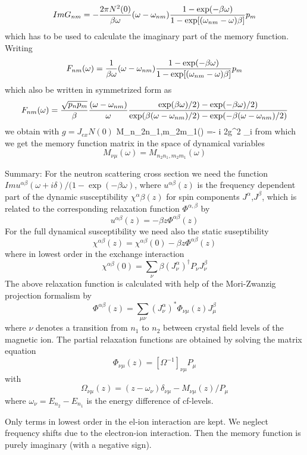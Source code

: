 $$
Im G_{nm}=-{2\pi N^2(0)\over \beta \omega}(\omega -\omega_{nm}) {1-\exp(-\beta
\omega)\over
1-\exp[(\omega_{nm}-\omega)\beta]}p_m
$$
which has to be used to calculate the imaginary part of the memory function.
Writing 
$$
F_{nm}(\omega )= {1\over \beta \omega}(\omega -\omega_{nm}) {1-\exp(-\beta
\omega)\over
1-\exp[(\omega_{nm}-\omega)\beta]}p_m
$$
which also be written in symmetrized form as
$$
F_{nm}(\omega )= {\sqrt{p_np_m}\over \beta}{(\omega -\omega_{nm})\over
\omega} {\exp(\beta \omega)/2) - \exp(-\beta \omega)/2)\over
\exp(\beta (\omega-\omega_{nm})/2) - \exp(-\beta (\omega -\omega_{nm})/2)}
$$
we obtain with $g=J_{ex}N(0)$
\eqnarray
M_{n_2n_1,m_2m_1}(\omega) =- i 2\pi g^2
\sum_i
\nonumber
\endeqnarray
from which we get the memory function matrix in the space of dynamical variables
$$
M_{\nu \mu}(\omega)= M_{n_2n_1,m_2m_1}(\omega)
$$

\bigskip
\noindent


Summary:
For the neutron scattering cross section we need the function 
$Im u^{\alpha\beta}(\omega+i\delta)/(1-\exp(-\beta\omega)$, where
$u^{\alpha\beta}(z)$ is the frequency dependent part of the dynamic
susceptibility $\chi^\alpha\beta(z)$ for spin components  $J^\alpha$,$J^\beta$, which is
related to the corresponding relaxation function $\Phi^{\alpha,\beta}$ by
$$
u^{\alpha\beta}(z)= -\beta z \Phi^{\alpha\beta}(z)
$$
For the full dynamical susceptibility we need also the static suseptibility
$$
\chi^{\alpha\beta}(z) = \chi^{\alpha\beta}(0) - \beta z \Phi^{\alpha\beta}(z)  
$$
where in lowest order in the exchange interaction 
$$
\chi^{\alpha\beta}(0)  = \sum_\nu \beta (J^\alpha_\nu)^\dagger P_\nu J^\beta_\nu
$$
The above relaxation function is calculated with help of the Mori-Zwanzig
projection formalism by 
$$
\Phi^{\alpha\beta}(z)=\sum_{\mu\nu}
(J^\alpha_\nu)^*\Phi_{\nu\mu}(z)J^\beta_\mu
$$
where $\nu$ denotes a transition from $n_1$ to $n_2$ between crystal field
levels of the magnetic ion. The partial relaxation functions are obtained by 
solving the matrix
equation
$$
\Phi_{\nu\mu}(z)= [\Omega^{-1}]_{\nu\mu}P_\mu      
$$
with
$$
\Omega_{\nu\mu}(z)= (z-\omega_\nu)\delta_{\nu\mu}  -M_{\nu\mu}(z)/P_\mu
$$
where $\omega_\nu =E_{n_2}- E_{n_1}$ is the energy difference of cf-levels.

Only terms in  lowest  order in the el-ion interaction are kept. We neglect
frequency shifts due to the electron-ion interaction. 
Then the  memory function is purely
imaginary (with a negative  sign).

